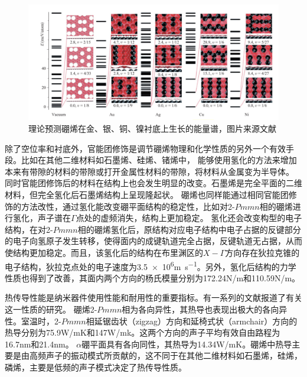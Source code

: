 \begin{figure}
  \includegraphics[width=1.06\textwidth]{figs/ch1_borophene_energy_spectra.png}
  \centering
  \caption{理论预测硼烯在金、银、铜、镍衬底上生长的能量谱，图片来源文献\cite{zhang2015two}}
  \label{fig:ch1_borophene_energy_spectra}
\end{figure}

除了空位率和衬底外，官能团修饰是调节硼烯物理和化学性质的另外一个有效手段。比如在其他二维材料如石墨烯、硅烯、锗烯中，
能够使用氢化的方法来增加本来有带隙的材料的带隙或打开金属性材料的带隙，将材料从金属变为半导体\cite{balog2010bandgap,bhattacharya2011strain,houssa2011electronic}。
同时官能团修饰后的材料在结构上也会发生明显的改变。石墨烯是完全平面的二维材料，但完全氢化后石墨烯结构上呈现隆起状。
硼烯也同样能通过相同官能团修饰的方法改性，通过氢化能改变硼平面结构的稳定性，比如对2-$Pmmn$相的硼烯进行氢化，声子谱在$\Gamma$点处的虚频消失，结构上更加稳定\cite{xu2016hydrogenated,wang2016high}。
氢化还会改变构型的电子结构\cite{xu2016hydrogenated}，在对2-$Pmmn$相的硼烯氢化后，原结构对应电子结构中电子占据的反键部分的电子向氢原子发生转移，使得面内的成键轨道完全占据，反键轨道无占据，从而使结构更加稳定。而且，该氢化后的结构在布里渊区的$X-\Gamma$方向存在狄拉克锥的电子结构，狄拉克点处的电子速度为\num{3.5e6}\si{\metre\per\second}\cite{xu2016hydrogenated}。另外，氢化后结构的力学性质也得到了改善，其面内两个方向的杨氏模量分别为172.24N/m和110.59N/m\cite{wang2016high}。

热传导性能是纳米器件使用性能和耐用性的重要指标。有一系列的文献\cite{li2018stretch,mortazavi2018borophene,zhou2017superior,liu2017anisotropic,sun2016first,mortazavi2017anomalous}报道了有关这一性质的研究。
硼烯2-$Pmmn$相为各向异性，其热导也表现出极大的各向异性。室温时，2-$Pmmn$相延锯齿状（zigzag）方向和延椅式状（armchair）方向的热导分别为75.9W/mK和147W/mk。这两个方向的声子平均有效自由路程为16.7nm和21.4nm。
$\alpha$硼平面具有各向同性，其热导为14.34W/mK。硼烯中热导主要是由高频声子的振动模式所贡献的，这不同于在其他二维材料如石墨烯，硅烯，磷烯，主要是低频的声子模式决定了热传导性质\cite{gu2015first,qin2015anisotropic}。

